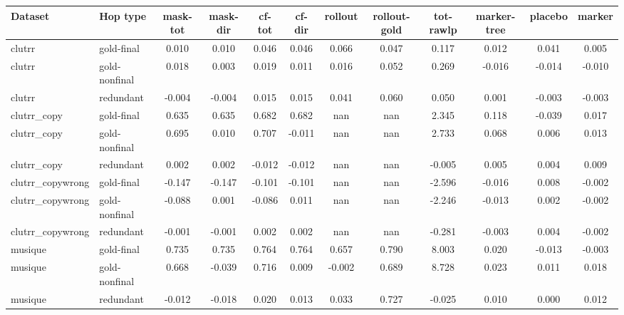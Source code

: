 \begin{tabular}{llcccccccccc}
\toprule
Dataset & Hop type & mask-tot & mask-dir & cf-tot & cf-dir & rollout & rollout-gold & tot-rawlp & marker-tree & placebo & marker \\
\midrule
clutrr & gold-final & 0.010 & 0.010 & 0.046 & 0.046 & 0.066 & 0.047 & 0.117 & 0.012 & 0.041 & 0.005 \\
clutrr & gold-nonfinal & 0.018 & 0.003 & 0.019 & 0.011 & 0.016 & 0.052 & 0.269 & -0.016 & -0.014 & -0.010 \\
clutrr & redundant & -0.004 & -0.004 & 0.015 & 0.015 & 0.041 & 0.060 & 0.050 & 0.001 & -0.003 & -0.003 \\
clutrr\_copy & gold-final & 0.635 & 0.635 & 0.682 & 0.682 & nan & nan & 2.345 & 0.118 & -0.039 & 0.017 \\
clutrr\_copy & gold-nonfinal & 0.695 & 0.010 & 0.707 & -0.011 & nan & nan & 2.733 & 0.068 & 0.006 & 0.013 \\
clutrr\_copy & redundant & 0.002 & 0.002 & -0.012 & -0.012 & nan & nan & -0.005 & 0.005 & 0.004 & 0.009 \\
clutrr\_copywrong & gold-final & -0.147 & -0.147 & -0.101 & -0.101 & nan & nan & -2.596 & -0.016 & 0.008 & -0.002 \\
clutrr\_copywrong & gold-nonfinal & -0.088 & 0.001 & -0.086 & 0.011 & nan & nan & -2.246 & -0.013 & 0.002 & -0.002 \\
clutrr\_copywrong & redundant & -0.001 & -0.001 & 0.002 & 0.002 & nan & nan & -0.281 & -0.003 & 0.004 & -0.002 \\
musique & gold-final & 0.735 & 0.735 & 0.764 & 0.764 & 0.657 & 0.790 & 8.003 & 0.020 & -0.013 & -0.003 \\
musique & gold-nonfinal & 0.668 & -0.039 & 0.716 & 0.009 & -0.002 & 0.689 & 8.728 & 0.023 & 0.011 & 0.018 \\
musique & redundant & -0.012 & -0.018 & 0.020 & 0.013 & 0.033 & 0.727 & -0.025 & 0.010 & 0.000 & 0.012 \\
\bottomrule
\end{tabular}
